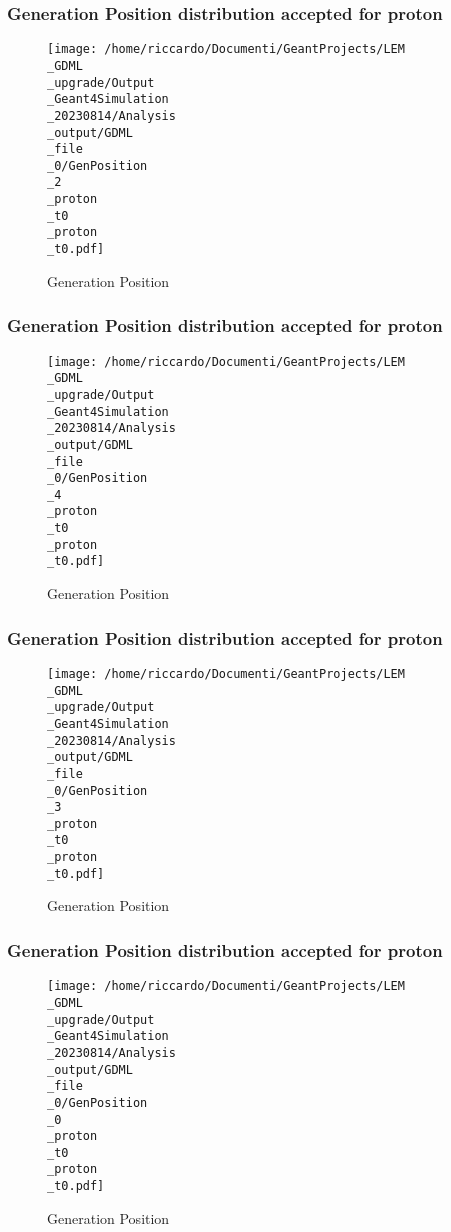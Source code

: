 \documentclass[8pt]{beamer}
\begin{document}
            \begin{frame}
                \frametitle{Generation Position distribution accepted for proton}
            
        \begin{figure}[h]
            \centering
            \texttt{[image: /home/riccardo/Documenti/GeantProjects/LEM\\\_GDML\\\_upgrade/Output\\\_Geant4Simulation\\\_20230814/Analysis\\\_output/GDML\\\_file\\\_0/GenPosition\\\_2\\\_proton\\\_t0\\\_proton\\\_t0.pdf]}
            \caption{Generation Position}
        \end{figure}
        
            \end{frame}
            
            \begin{frame}
                \frametitle{Generation Position distribution accepted for proton}
            
        \begin{figure}[h]
            \centering
            \texttt{[image: /home/riccardo/Documenti/GeantProjects/LEM\\\_GDML\\\_upgrade/Output\\\_Geant4Simulation\\\_20230814/Analysis\\\_output/GDML\\\_file\\\_0/GenPosition\\\_4\\\_proton\\\_t0\\\_proton\\\_t0.pdf]}
            \caption{Generation Position}
        \end{figure}
        
            \end{frame}
            
            \begin{frame}
                \frametitle{Generation Position distribution accepted for proton}
            
        \begin{figure}[h]
            \centering
            \texttt{[image: /home/riccardo/Documenti/GeantProjects/LEM\\\_GDML\\\_upgrade/Output\\\_Geant4Simulation\\\_20230814/Analysis\\\_output/GDML\\\_file\\\_0/GenPosition\\\_3\\\_proton\\\_t0\\\_proton\\\_t0.pdf]}
            \caption{Generation Position}
        \end{figure}
        
            \end{frame}
            
            \begin{frame}
                \frametitle{Generation Position distribution accepted for proton}
            
        \begin{figure}[h]
            \centering
            \texttt{[image: /home/riccardo/Documenti/GeantProjects/LEM\\\_GDML\\\_upgrade/Output\\\_Geant4Simulation\\\_20230814/Analysis\\\_output/GDML\\\_file\\\_0/GenPosition\\\_0\\\_proton\\\_t0\\\_proton\\\_t0.pdf]}
            \caption{Generation Position}
        \end{figure}
        
            \end{frame}
            
\end{document}
